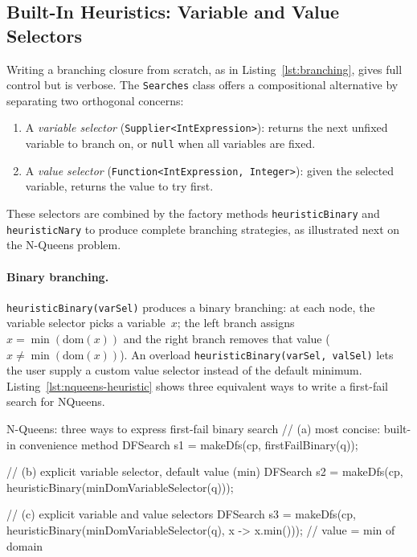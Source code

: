 \documentclass[11pt, a4paper]{scrartcl}
\begin{document}
\subsection{Built-In Heuristics: Variable and Value Selectors}

Writing a branching closure from scratch, as in Listing~\ref{lst:branching}, gives full control but is verbose.
The \texttt{Searches} class offers a compositional alternative by separating two orthogonal concerns:
\begin{enumerate}
    \item A \emph{variable selector} (\texttt{Supplier<IntExpression>}): returns the next unfixed variable to branch on, or \texttt{null} when all variables are fixed.
    \item A \emph{value selector} (\texttt{Function<IntExpression, Integer>}): given the selected variable, returns the value to try first.
\end{enumerate}

\noindent
These selectors are combined by the factory methods \texttt{heuristicBinary} and \texttt{heuristicNary} to produce complete branching strategies, as illustrated next on the N-Queens problem.

\paragraph{Binary branching.}
\texttt{heuristicBinary(varSel)} produces a binary branching: at each node, the variable selector picks a variable~$x$; the left branch assigns $x = \min(\text{dom}(x))$ and the right branch removes that value ($x \neq \min(\text{dom}(x))$).
An overload \texttt{heuristicBinary(varSel, valSel)} lets the user supply a custom value selector instead of the default minimum.
Listing~\ref{lst:nqueens-heuristic} shows three equivalent ways to write a first-fail search for NQueens.

\begin{codebox}[label={lst:nqueens-heuristic}]{N-Queens: three ways to express first-fail binary search}
// (a) most concise: built-in convenience method
DFSearch s1 = makeDfs(cp, firstFailBinary(q));

// (b) explicit variable selector, default value (min)
DFSearch s2 = makeDfs(cp,
    heuristicBinary(minDomVariableSelector(q)));

// (c) explicit variable and value selectors
DFSearch s3 = makeDfs(cp,
    heuristicBinary(minDomVariableSelector(q),
                    x -> x.min())); // value = min of domain
\end{codebox}
\end{document}
